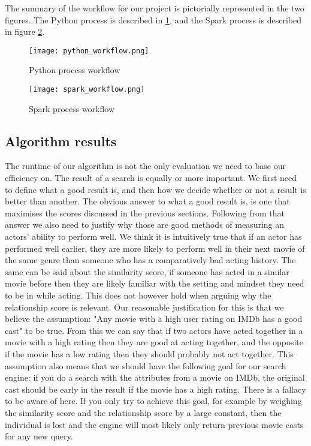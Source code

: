 The summary of the workflow for our project is pictorially represented in the two figures. The Python process is described in \ref{fig:python-process}, and the Spark process is described in figure \ref{fig:spark-process}.

\begin{figure}[t]
	\texttt{[image: python\_workflow.png]}
	\caption{Python process workflow}
	\label{fig:python-process}
\end{figure}


\begin{figure}[t]
	\texttt{[image: spark\_workflow.png]}
	\caption{Spark process workflow}
	\label{fig:spark-process}
\end{figure}



\subsection{Algorithm results}

The runtime of our algorithm is not the only evaluation we need to base our efficiency on. The result of a search is equally or more important. We first need to define what a good result is, and then how we decide whether or not a result is better than another. The obvious answer to what a good result is, is one that maximises the scores discussed in the previous sections. Following from that answer we also need to justify why those are good methods of measuring an actors’ ability to perform well. We think it is intuitively true that if an actor has performed well earlier, they are more likely to perform well in their next movie of the same genre than someone who has a comparatively bad acting history. The same can be said about the similarity score, if someone has acted in a similar movie before then they are likely familiar with the setting and mindset they need to be in while acting. This does not however hold when arguing why the relationship score is relevant. Our reasonable justification for this is that we believe the assumption: "Any movie with a high user rating on IMDb has a good cast" to be true. From this we can say that if two actors have acted together in a movie with a high rating then they are good at acting together, and the opposite if the movie has a low rating then they should probably not act together. This assumption also means that we should have the following goal for our search engine: if you do a search with the attributes from a movie on IMDb, the original cast should be early in the result if the movie has a high rating. There is a fallacy to be aware of here. If you only try to achieve this goal, for example by weighing the similarity score and the relationship score by a large constant, then the individual is lost and the engine will most likely only return previous movie casts for any new query. 

